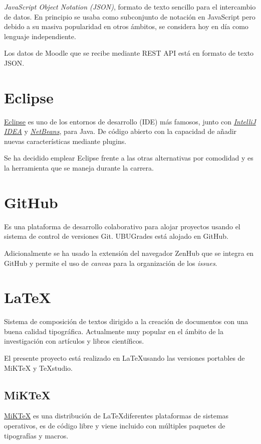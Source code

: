 \textit{JavaScript Object Notation (JSON)}, formato de texto sencillo para el intercambio de datos. En principio se usaba como subconjunto de notación en JavaScript pero debido a su masiva popularidad en otros ámbitos, se considera hoy en día como lenguaje independiente.

Los datos de Moodle que se recibe mediante REST API está en formato de texto JSON.

\section{Eclipse}

\href{https://www.eclipse.org/}{Eclipse} es uno de los entornos de desarrollo (IDE) más famosos, junto con
\href{https://www.jetbrains.com}{\textit{IntelliJ IDEA}} y \href{https://netbeans.org/}{\textit{NetBeans}}, para Java. De código abierto con la capacidad de añadir nuevas características mediante plugins.

Se ha decidido emplear Eclipse frente a las otras alternativas por comodidad y es la herramienta que se maneja durante la carrera.

\section{GitHub}
Es una plataforma de desarrollo colaborativo para alojar proyectos usando el sistema de control de versiones Git. UBUGrades está alojado en GitHub.

Adicionalmente se ha usado la extensión del navegador ZenHub que se integra en GitHub y permite el uso de \textit{canvas} para la organización de los \textit{issues}.


\section{LaTeX}

Sistema de composición de textos dirigido a la creación de documentos con una buena calidad tipográfica. Actualmente muy popular en el ámbito de la investigación con artículos y libros científicos.

El presente proyecto está realizado en \LaTeX usando las versiones portables de MiKTeX y TeXstudio. 

\subsection{MiKTeX}

\href{https://miktex.org/}{MiKTeX} es una distribución de \LaTeX diferentes plataformas de sistemas operativos, es de código libre y viene incluido con múltiples paquetes de tipografías y macros.

